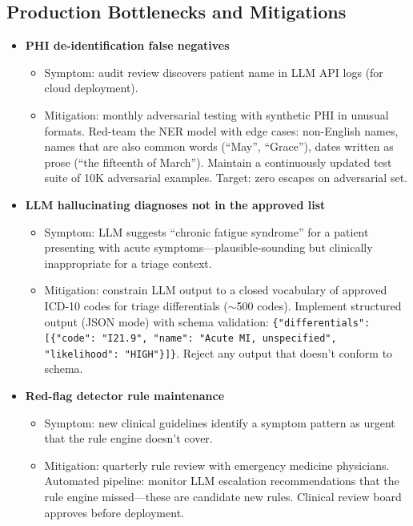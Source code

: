 \subsection*{Production Bottlenecks and Mitigations}
\begin{itemize}
  \item \textbf{PHI de-identification false negatives}
  \begin{itemize}
    \item Symptom: audit review discovers patient name in LLM API logs (for cloud deployment).
    \item Mitigation: monthly adversarial testing with synthetic PHI in unusual formats. Red-team the NER model with edge cases: non-English names, names that are also common words (``May'', ``Grace''), dates written as prose (``the fifteenth of March''). Maintain a continuously updated test suite of 10K adversarial examples. Target: zero escapes on adversarial set.
  \end{itemize}

  \item \textbf{LLM hallucinating diagnoses not in the approved list}
  \begin{itemize}
    \item Symptom: LLM suggests ``chronic fatigue syndrome'' for a patient presenting with acute symptoms---plausible-sounding but clinically inappropriate for a triage context.
    \item Mitigation: constrain LLM output to a closed vocabulary of approved ICD-10 codes for triage differentials ($\sim$500 codes). Implement structured output (JSON mode) with schema validation: \texttt{\{"differentials": [\{"code": "I21.9", "name": "Acute MI, unspecified", "likelihood": "HIGH"\}]\}}. Reject any output that doesn't conform to schema.
  \end{itemize}

  \item \textbf{Red-flag detector rule maintenance}
  \begin{itemize}
    \item Symptom: new clinical guidelines identify a symptom pattern as urgent that the rule engine doesn't cover.
    \item Mitigation: quarterly rule review with emergency medicine physicians. Automated pipeline: monitor LLM escalation recommendations that the rule engine missed---these are candidate new rules. Clinical review board approves before deployment.
  \end{itemize}


\end{itemize}
